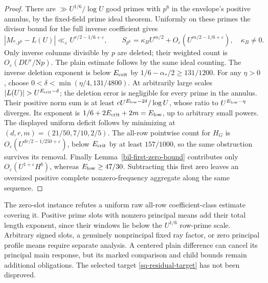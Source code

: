 \documentclass[11pt]{article}
\theoremstyle{definition}
\newcommand{\N}{\mathrm N}
\newcommand{\eps}{\varepsilon}
\begin{document}
\begin{proof}
There are $\gg U^{1/6}/\log U$ good primes with $p^6$ in the envelope's
positive annulus, by the fixed-field prime ideal theorem. Uniformly on
these primes the divisor bound for the full inverse coefficient gives
\[
 |M_{*,p^6}-L(U)|\ll_\eps U^{r/2-1/6+\eps},\qquad
 S_{p^6}=\kappa_B U^{m/2}
                      +O_\eps(U^{m/2-1/6+\eps}),\quad\kappa_B\ne0.
\]
Only inverse columns divisible by $p$ are deleted; their weighted count
is $O_\eps(DU^\eps/\N p)$. The plain estimate follows by the same
ideal counting. The inverse deletion exponent is below $E_{\rm crit}$
by $1/6-\alpha_*/2\ge131/1200$.
For any $\eta>0$, choose $0<\delta<\min(\eta/4,131/4800)$.
At arbitrarily large scales $|L(U)|>U^{E_{\rm crit}-\delta}$; the
deletion error is negligible for every prime in the annulus. Their
positive norm sum is at least $cU^{E_{\rm low}-2\delta}/\log U$,
whose ratio to $U^{E_{\rm low}-\eta}$ diverges. Its exponent is
$1/6+2E_{\rm crit}+2m=E_{\rm low}$, up to arbitrary small powers.
The displayed uniform deficit follows by minimizing at
$(d,r,m)=(21/50,7/10,2/5)$.
The all-row pointwise count for $H_G$ is
$O_\eps(U^{dr/2-1/250+\eps})$, below $E_{\rm crit}$ by at least
$157/1000$, so the same obstruction survives its removal.
Finally Lemma~\ref{bil-first-zero-bound} contributes only
$O_\eps(U^{1+\eps}H^b)$, whereas $E_{\rm low}\ge47/30$.
Subtracting this first zero leaves an oversized positive complete
nonzero-frequency aggregate along the same sequence.
\end{proof}
The zero-slot instance refutes a uniform raw all-row coefficient-class
estimate covering it. Positive prime slots with nonzero principal means
add their total length exponent, since their windows lie below the
$U^{1/6}$ row-prime scale. Arbitrary signed slots, a genuinely
nonprincipal fixed ray factor, or zero principal profile means require
separate analysis. A centered plain difference can cancel its principal
main response, but its marked comparison and child bounds remain
additional obligations. The selected target \eqref{sq-residual-target}
has not been disproved.
\end{document}
